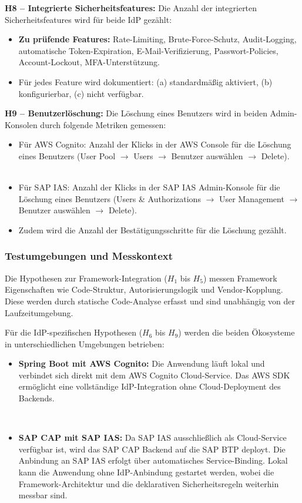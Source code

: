 \textbf{H8 – Integrierte Sicherheitsfeatures:}
Die Anzahl der integrierten Sicherheitsfeatures wird für beide \ac{IdP} gezählt:
\begin{itemize}
    \item \textbf{Zu prüfende Features:} Rate-Limiting, Brute-Force-Schutz, Audit-Logging, automatische Token-Expiration, E-Mail-Verifizierung, Passwort-Policies, Account-Lockout, MFA-Unterstützung.
    \item Für jedes Feature wird dokumentiert: (a) standardmäßig aktiviert, (b) konfigurierbar, (c) nicht verfügbar.
\end{itemize}

\textbf{H9 – Benutzerlöschung:}
Die Löschung eines Benutzers wird in beiden Admin-Konsolen durch folgende Metriken gemessen:
\begin{itemize}
    \item Für \ac{AWS} Cognito: Anzahl der Klicks in der AWS Console für die Löschung eines Benutzers (User Pool $\rightarrow$ Users $\rightarrow$ Benutzer auswählen $\rightarrow$ Delete).
    \item Für \ac{SAP IAS}: Anzahl der Klicks in der SAP IAS Admin-Konsole für die Löschung eines Benutzers (Users \& Authorizations $\rightarrow$ User Management $\rightarrow$ Benutzer auswählen $\rightarrow$ Delete).
    \item Zudem wird die Anzahl der Bestätigungsschritte für die Löschung gezählt.
\end{itemize}

\subsubsection{Testumgebungen und Messkontext}

Die Hypothesen zur Framework-Integration ($H_1$ bis $H_5$) messen Framework Eigenschaften wie Code-Struktur, Autorisierungslogik und Vendor-Kopplung. Diese werden durch statische Code-Analyse erfasst und sind unabhängig von der Laufzeitumgebung.

Für die IdP-spezifischen Hypothesen ($H_6$ bis $H_9$) werden die beiden Ökosysteme in unterschiedlichen Umgebungen betrieben:

\begin{itemize}
    \item \textbf{Spring Boot mit \ac{AWS} Cognito:} Die Anwendung läuft lokal und verbindet sich direkt mit dem \ac{AWS} Cognito Cloud-Service. Das \ac{AWS} \ac{SDK} ermöglicht eine vollständige \ac{IdP}-Integration ohne Cloud-Deployment des Backends.

    \item \textbf{\ac{SAP CAP} mit \ac{SAP IAS}:} Da \ac{SAP IAS} ausschließlich als Cloud-Service verfügbar ist, wird das \ac{SAP CAP} Backend auf die \ac{SAP BTP} deployt. Die Anbindung an \ac{SAP IAS} erfolgt über automatisches Service-Binding. Lokal kann die Anwendung ohne \ac{IdP}-Anbindung gestartet werden, wobei die Framework-Architektur und die deklarativen Sicherheitsregeln weiterhin messbar sind.
\end{itemize}

